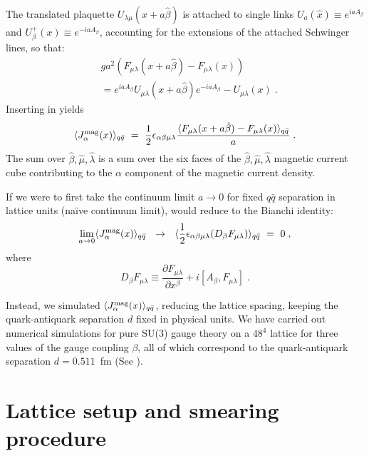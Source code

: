 \documentclass[pdftex,twocolumn,epjc3,envcountsect]{svjour3}
\begin{document}
The translated plaquette $U_{\lambda \mu} (x + a \hat{\beta})$ is attached to single links $U_a (\hat{x}) \equiv e^{i a A_\beta}$ and $U_\beta^+ (x) \equiv e^{-i a A_\beta}$, accounting for the extensions of the attached Schwinger lines, so that:
\begin {align}
&g a^2 (F_{\mu \lambda} (x + a \hat{\beta}) - F_{\mu \lambda} (x)) \nonumber \\&= e^{ i a A_\beta} U_{ \mu \lambda} (x + a \hat{\beta}) e^{-i a A_\beta} - U_{ \mu \lambda} (x)\;.
    \label{extensions}
\end{align}
%
Inserting  in  yields
    \begin {equation}
    \langle J_\alpha^{\rm mag} (x) \rangle_{q \bar{q}}~ =~ \frac{1}{2} \epsilon_{\alpha \beta    \mu \lambda} \frac{\langle F_{  \mu \lambda} (x + a \hat{\beta}) - F_{\mu \lambda  } (x) \rangle_{q \bar{q}}}{a}\;.
    \label{jmagexpect}
\end{equation}
The sum over $\hat{\beta}, \hat{\mu}, \hat{\lambda} $ is a sum over the six faces of the $\hat{\beta}, \hat{\mu}, \hat{\lambda}$ magnetic current cube contributing to the $\alpha$ component of the magnetic current density.
    
If we were to first take the continuum limit $a \rightarrow 0$ for fixed $q \bar{q}$ separation in lattice units (na\"ive continuum limit),  would reduce to the Bianchi identity:
    \begin {equation}
    \lim_{a \rightarrow 0} \langle J^{\rm mag}_\alpha (x)\rangle_{q \bar{q}}~~ \rightarrow ~~\langle \frac{1}{2} \epsilon_{\alpha \beta \mu \lambda} (D_\beta F_{ \mu \lambda} )\rangle_{q \bar{q}} ~=~0\;,
    \label{Bianchi}
\end{equation}
where
\begin {equation}
    D_\beta F_{ \mu \lambda} \equiv \frac {\partial F_{ \mu \lambda}}{\partial x^\beta} + i [A_\beta, F_{ \mu \lambda}]\;. 
    \label{Dbeta}
\end{equation}

Instead, we simulated $\langle J_\alpha^{\rm mag} (x) \rangle_{q \bar{q}}$, reducing the lattice spacing, keeping the quark-antiquark separation $d$ fixed in physical units.
We  have carried out numerical simulations for pure SU(3) gauge theory on a $48^4$ lattice for three values of the gauge coupling $\beta$, all of which correspond to the quark-antiquark separation $d = 0.511$~fm  (See ).
%
\section{Lattice setup and smearing procedure}
\label{sec:setup}
\end{document}
